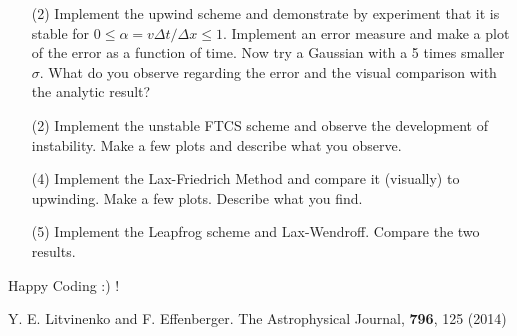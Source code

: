\documentclass[11pt]{article}
\begin{document}
\vspace*{-0.5cm}
\begin{enumerate}
\item[(2)] Implement the upwind scheme and demonstrate by experiment that
  it is stable for $0 \le \alpha = v \Delta t / \Delta x \le 1$. Implement
  an error measure and make a plot of the error as a function of time. Now
  try a Gaussian with a 5 times smaller $\sigma$. What do you observe regarding
  the error and the visual comparison with the analytic result?
  \vspace{0.1cm}


\item[(2)] Implement the unstable FTCS scheme and observe the development
  of instability. Make a few plots and describe what you observe.
  
  \item[(4)]Implement the Lax-Friedrich Method and
  compare it (visually) to upwinding. Make a few plots. Describe what
  you find.

\item[(5)] 
  Implement the Leapfrog scheme and Lax-Wendroff. Compare the two
  results.
  \end{enumerate}

Happy Coding :) !

\begin{thebibliography}{10}
 Y. E. Litvinenko and F. Effenberger. The Astrophysical Journal, \textbf{796}, 125 (2014)

\end{thebibliography}
\end{document}
